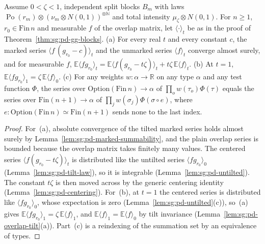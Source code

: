 \begin{lemma}\label{lem:sg:pd-unit-tilt-mark}
  \leanok
Assume $0<\zeta<1$, independent split blocks $B_m$ with laws $\operatorname{Po}(r_m)\otimes(\nu_m\otimes N(0,1))^{\otimes\mathbb N}$ and total intensity $\mu_\zeta\otimes N(0,1)$. For $n\ge1$, $r_0\in\mathrm{Fin}\,n$ and measurable $f$ of the overlap matrix, let $\langle\cdot\rangle_t$ be as in the proof of Theorem~\ref{thm:sg:pd-gg-blocks}.
(a) For every real $t$ and every constant $c$, the marked series $\langle f\,(g_{r_0}-c)\rangle_t$ and the unmarked series $\langle f\rangle_t$ converge almost surely, and for measurable $f$,
$\mathbb E\langle fg_{r_0}\rangle_t=\mathbb E\langle f(g_{r_0}-t\zeta)\rangle_t+t\zeta\,\mathbb E\langle f\rangle_t$.
(b) At $t=1$, $\mathbb E\langle fg_{r_0}\rangle_1=\zeta\,\mathbb E\langle f\rangle_0$.
(c) For any weights $w:\alpha\to\mathbb R$ on any type $\alpha$ and any test function $\Phi$, the series over $\mathrm{Option}(\mathrm{Fin}\,n)\to\alpha$ of $\prod_ow(\tau_o)\Phi(\tau)$ equals the series over $\mathrm{Fin}(n+1)\to\alpha$ of $\prod_jw(\sigma_j)\Phi(\sigma\circ e)$, where $e:\mathrm{Option}(\mathrm{Fin}\,n)\simeq\mathrm{Fin}(n+1)$ sends $\mathrm{none}$ to the last index.
\end{lemma}
\begin{proof}
  \leanok
For~(a), absolute convergence of the tilted marked series holds almost surely by Lemma~\ref{lem:sg:pd-marked-summability}, and the plain overlap series is bounded because the overlap matrix takes finitely many values. The centered series $\langle f(g_{r_0}-t\zeta)\rangle_t$ is distributed like the untilted series $\langle fg_{r_0}\rangle_0$ (Lemma~\ref{lem:sg:pd-tilt-law}), so it is integrable (Lemma~\ref{lem:sg:pd-untilted}). The constant $t\zeta$ is then moved across by the generic centering identity (Lemma~\ref{lem:sg:pd-centering}). For~(b), at $t=1$ the centered series is distributed like $\langle fg_{r_0}\rangle_0$, whose expectation is zero (Lemma~\ref{lem:sg:pd-untilted}(c)), so~(a) gives $\mathbb E\langle fg_{r_0}\rangle_1=\zeta\,\mathbb E\langle f\rangle_1$, and $\mathbb E\langle f\rangle_1=\mathbb E\langle f\rangle_0$ by tilt invariance (Lemma~\ref{lem:sg:pd-overlap-tilt}(a)). Part~(c) is a reindexing of the summation set by an equivalence of types.
\end{proof}


